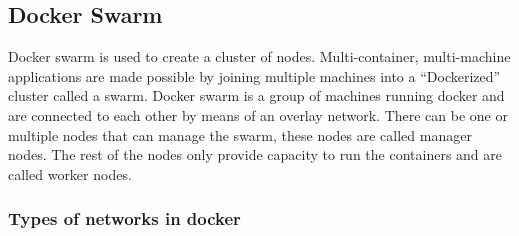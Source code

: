 \documentclass[12pt]{article}
\begin{document}
\subsection{Docker Swarm}
Docker swarm is used to create a cluster of nodes. Multi-container, multi-machine applications are made possible by joining multiple machines into a “Dockerized” cluster called a swarm. Docker swarm is a group of machines running docker and are connected to each other by means of an overlay network. There can be one or multiple nodes that can manage the swarm, these nodes are called manager nodes. The rest of the nodes only provide capacity to run the containers and are called worker nodes. 
\subsubsection{Types of networks in docker}
\end{document}
